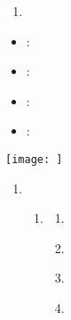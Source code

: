 \documentclass[12pt, amssymb, one column]{article}
\begin{document}

 \begin{enumerate}
   \item 
\end{enumerate}

\par 
\noindent
\noindent
 \begin{itemize}
   \item \textit{}: 
   \item \textit{}: 
   \item \textit{}: 
   \item \textit{}: 
 \end{itemize}

\texttt{[image: ]}


\begin{enumerate}[resume]
   \item
   \begin{enumerate}
	\item\textbf{ }
      \begin{enumerate}
       \item\textit{}
       \item\textit{}
       \item\textit{}
       \item\textit{}
   
	 \end{enumerate}
   \end{enumerate}

 \end{enumerate}
\end{document}
